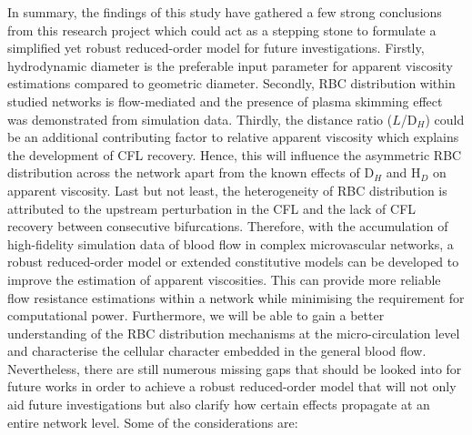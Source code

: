 \noindent In summary, the findings of this study have gathered a few strong conclusions from this research project which could act as a stepping stone to formulate a simplified yet robust reduced-order model for future investigations. Firstly, hydrodynamic diameter is the preferable input parameter for apparent viscosity estimations compared to geometric diameter. Secondly, RBC distribution within studied networks is flow-mediated and the presence of plasma skimming effect was demonstrated from simulation data. Thirdly, the distance ratio ($L$/D$_{H}$) could be an additional contributing factor to relative apparent viscosity which explains the development of CFL recovery. Hence, this will influence the asymmetric RBC distribution across the network apart from the known effects of D$_{H}$ and H$_{D}$ on apparent viscosity. Last but not least, the heterogeneity of RBC distribution is attributed to the upstream perturbation in the CFL and the lack of CFL recovery between consecutive bifurcations. Therefore, with the accumulation of high-fidelity simulation data of blood flow in complex microvascular networks, a robust reduced-order model or extended constitutive models can be developed to improve the estimation of apparent viscosities. This can provide more reliable flow resistance estimations within a network while minimising the requirement for computational power. Furthermore, we will be able to gain a better understanding of the RBC distribution mechanisms at the micro-circulation level and characterise the cellular character embedded in the general blood flow. \\

\noindent Nevertheless, there are still numerous missing gaps that should be looked into for future works in order to achieve a robust reduced-order model that will not only aid future investigations but also clarify how certain effects propagate at an entire network level. Some of the considerations are:

